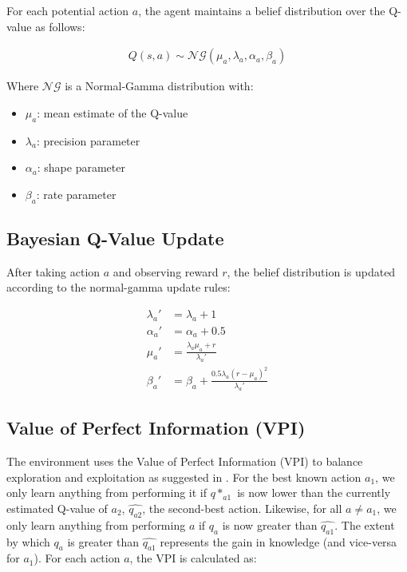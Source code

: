 For each potential action $a$, the agent maintains a belief distribution over the Q-value as follows:

\begin{align}
    Q(s, a) \sim \mathcal{NG}(\mu_{a}, \lambda_{a}, \alpha_{a}, \beta_{a})
\end{align}

Where $\mathcal{NG}$ is a Normal-Gamma distribution with:
\begin{itemize}
    \item $\mu_{a}$: mean estimate of the Q-value
    \item $\lambda_{a}$: precision parameter
    \item $\alpha_{a}$: shape parameter
    \item $\beta_{a}$: rate parameter
\end{itemize}

\subsection{Bayesian Q-Value Update}

After taking action $a$ and observing reward $r$, the belief distribution is updated according to the normal-gamma update rules:

\begin{align}
\lambda_{a}' &= \lambda_{a} + 1\\
\alpha_{a}' &= \alpha_{a} + 0.5\\
\mu_{a}' &= \frac{\lambda_{a} \mu_{a} + r}{\lambda_{a}'}\\
\beta_{a}' &= \beta_{a} + \frac{0.5 \lambda_{a} (r - \mu_{a})^2}{\lambda_{a}'}
\end{align}

\subsection{Value of Perfect Information (VPI)}
The environment uses the Value of Perfect Information (VPI) to balance exploration and exploitation as suggested in \cite{matthews2012}. For the best known action $a_1$, we only learn anything from performing it if $q*_{
a1}$ is now lower than the currently estimated Q-value of $a_2$, $\hat{q_{a2}}$, the second-best action. Likewise, for all $a \neq a_1$, we only learn anything from performing $a$ if $q_a$ is now greater than $\hat{q_{a1}}$. The extent by which $q_a$ is greater than $\hat{q_{a1}}$ represents the gain in knowledge
(and vice-versa for $a_1$). For each action $a$, the VPI is calculated as:

